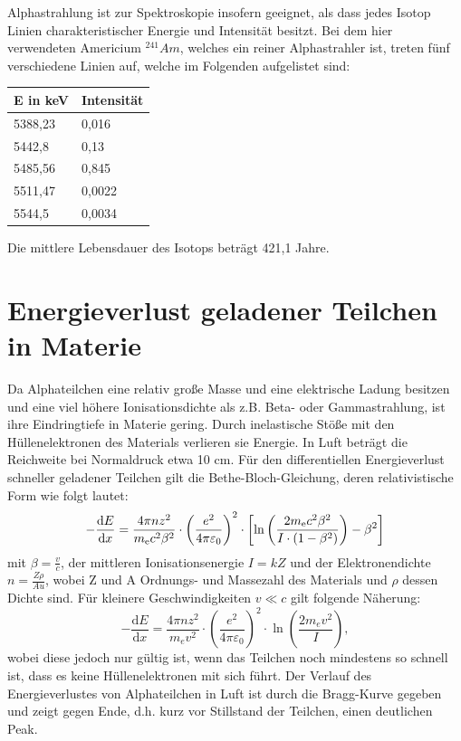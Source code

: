 \documentclass[bigchapter,colorback,accentcolor=tud4b,linedtoc,11pt]{tudreport}
\begin{document}
Alphastrahlung ist zur Spektroskopie insofern geeignet, als dass jedes Isotop Linien charakteristischer Energie und Intensität besitzt. Bei dem hier verwendeten Americium $^{241}Am$, welches ein reiner Alphastrahler ist, treten fünf verschiedene Linien auf, welche im Folgenden aufgelistet sind: 

\begin{center}
  \begin{tabular}{|p{5cm}|p{5cm}|}
    \hline
    E in keV & Intensität \\ \hline
    5388,23  & 0,016      \\ \hline
    5442,8   & 0,13       \\ \hline
    5485,56  & 0,845      \\ \hline
    5511,47  & 0,0022     \\ \hline
    5544,5   & 0,0034     \\ \hline
        \end{tabular}
\end{center}

Die mittlere Lebensdauer des Isotops beträgt 421,1 Jahre.

\section{Energieverlust geladener Teilchen in Materie}

Da Alphateilchen eine relativ große Masse und eine elektrische Ladung besitzen und eine viel höhere Ionisationsdichte als z.B. Beta- oder Gammastrahlung, ist ihre Eindringtiefe in Materie gering. Durch inelastische Stöße mit den Hüllenelektronen des Materials verlieren sie Energie. In Luft beträgt die Reichweite bei Normaldruck etwa 10 cm. Für den differentiellen Energieverlust schneller geladener Teilchen gilt die Bethe-Bloch-Gleichung, deren relativistische Form wie folgt lautet:
$$ - \frac{\mathrm{d}E}{\mathrm{d}x} = \frac{4 \pi nz^2}{m_{\rm e} c^2 \beta^2 } \cdot \left(\frac{e^2}{4\pi\varepsilon_0}\right)^2 \cdot \left[\ln \left(\frac{2m_{\rm e} c^2 \beta^2}{I \cdot (1-\beta^2)}\right) - \beta^2\right]$$
mit $\beta = \frac{v}{c}$, der mittleren Ionisationsenergie $I = kZ$ und der Elektronendichte $n = \frac{Z \rho}{A u}$, wobei Z und A Ordnungs- und Massezahl des Materials und $\rho$ dessen Dichte sind.
Für kleinere Geschwindigkeiten $v \ll c$ gilt folgende Näherung: 
$$- \frac{\mathrm{d}E}{\mathrm{d}x} = \frac{4 \pi nz^2}{m_e v^2}
\cdot \left(\frac{e^2}{4\pi\varepsilon_0}\right)^2
\cdot \ln \left(\frac{2m_e v^2 }{I}\right),$$
wobei diese jedoch nur gültig ist, wenn das Teilchen noch mindestens so schnell ist, dass es keine Hüllenelektronen mit sich führt.
Der Verlauf des Energieverlustes von Alphateilchen in Luft ist durch die Bragg-Kurve gegeben und zeigt gegen Ende, d.h. kurz vor Stillstand der Teilchen, einen deutlichen Peak.
\end{document}
